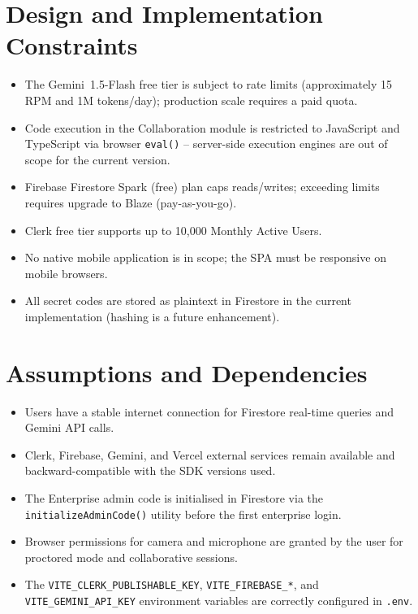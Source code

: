 \documentclass{fisatinternship}
\begin{document}
\section{Design and Implementation Constraints}
\begin{itemize}
  \item The Gemini~1.5-Flash free tier is subject to rate limits (approximately 15 RPM
        and 1M tokens/day); production scale requires a paid quota.
  \item Code execution in the Collaboration module is restricted to JavaScript and
        TypeScript via browser \texttt{eval()} -- server-side execution engines are
        out of scope for the current version.
  \item Firebase Firestore Spark (free) plan caps reads/writes; exceeding limits requires
        upgrade to Blaze (pay-as-you-go).
  \item Clerk free tier supports up to 10,000 Monthly Active Users.
  \item No native mobile application is in scope; the SPA must be responsive on mobile
        browsers.
  \item All secret codes are stored as plaintext in Firestore in the current
        implementation (hashing is a future enhancement).
\end{itemize}

\section{Assumptions and Dependencies}
\begin{itemize}
  \item Users have a stable internet connection for Firestore real-time queries and
        Gemini API calls.
  \item Clerk, Firebase, Gemini, and Vercel external services remain available and
        backward-compatible with the SDK versions used.
  \item The Enterprise admin code is initialised in Firestore via the
        \texttt{initializeAdminCode()} utility before the first enterprise login.
  \item Browser permissions for camera and microphone are granted by the user for
        proctored mode and collaborative sessions.
  \item The \texttt{VITE\_CLERK\_PUBLISHABLE\_KEY}, \texttt{VITE\_FIREBASE\_*},
        and \texttt{VITE\_GEMINI\_API\_KEY} environment variables are correctly
        configured in \texttt{.env}.
\end{itemize}
\end{document}
